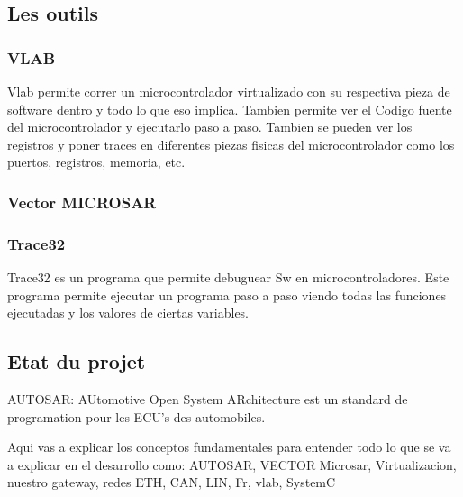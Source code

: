 \subsection{Les outils}
\subsubsection{VLAB}
Vlab permite correr un microcontrolador virtualizado con su respectiva pieza de software dentro y todo lo que eso implica. Tambien permite ver el Codigo fuente del microcontrolador y ejecutarlo paso a paso. Tambien se pueden ver los registros y poner traces en diferentes piezas fisicas del microcontrolador como los puertos, registros, memoria, etc.
\subsubsection{Vector MICROSAR}

\subsubsection{Trace32}
Trace32 es un programa que permite debuguear Sw en microcontroladores. Este programa permite ejecutar un programa paso a paso viendo todas las funciones ejecutadas y los valores de ciertas variables.

\subsection{Etat du projet}
AUTOSAR: AUtomotive Open System ARchitecture est un standard de programation pour les ECU's des automobiles.


Aqui vas a explicar los conceptos fundamentales para entender todo lo que se va a explicar en el desarrollo como: AUTOSAR, VECTOR Microsar, Virtualizacion, nuestro gateway, redes ETH, CAN, LIN, Fr, vlab, SystemC